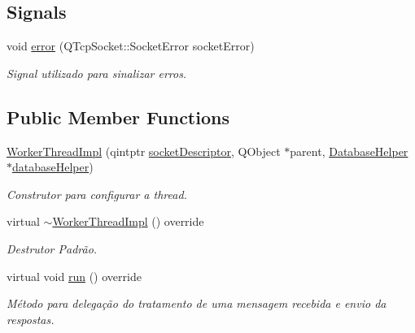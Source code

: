 \subsection*{Signals}
\begin{DoxyCompactItemize}
\item 
void \hyperlink{classWorkerThreadImpl_ae260562530b71dc55a6d360d5e4d896d}{error} (Q\+Tcp\+Socket\+::\+Socket\+Error socket\+Error)
\begin{DoxyCompactList}\small\item\em Signal utilizado para sinalizar erros. \end{DoxyCompactList}\end{DoxyCompactItemize}
\subsection*{Public Member Functions}
\begin{DoxyCompactItemize}
\item 
\hyperlink{classWorkerThreadImpl_a61d57c319668cbf86ad1642e8471b6db}{Worker\+Thread\+Impl} (qintptr \hyperlink{classWorkerThreadImpl_af3d6cf4437a92a4dbdf8c07a474a671b}{socket\+Descriptor}, Q\+Object $\ast$parent, \hyperlink{classDatabaseHelper}{Database\+Helper} $\ast$\hyperlink{classWorkerThreadImpl_a6a64f8daf91e56abf94c5a92bfc0fb88}{database\+Helper})
\begin{DoxyCompactList}\small\item\em Construtor para configurar a thread. \end{DoxyCompactList}\item 
virtual \hyperlink{classWorkerThreadImpl_acdb8da302c73c5ab454445029bbe6da1}{$\sim$\+Worker\+Thread\+Impl} () override\hypertarget{classWorkerThreadImpl_acdb8da302c73c5ab454445029bbe6da1}{}\label{classWorkerThreadImpl_acdb8da302c73c5ab454445029bbe6da1}

\begin{DoxyCompactList}\small\item\em Destrutor Padrão. \end{DoxyCompactList}\item 
virtual void \hyperlink{classWorkerThreadImpl_a24ef315ed0b7914ffd099c23a5a6e16c}{run} () override
\begin{DoxyCompactList}\small\item\em Método para delegação do tratamento de uma mensagem recebida e envio da respostas. \end{DoxyCompactList}\end{DoxyCompactItemize}

